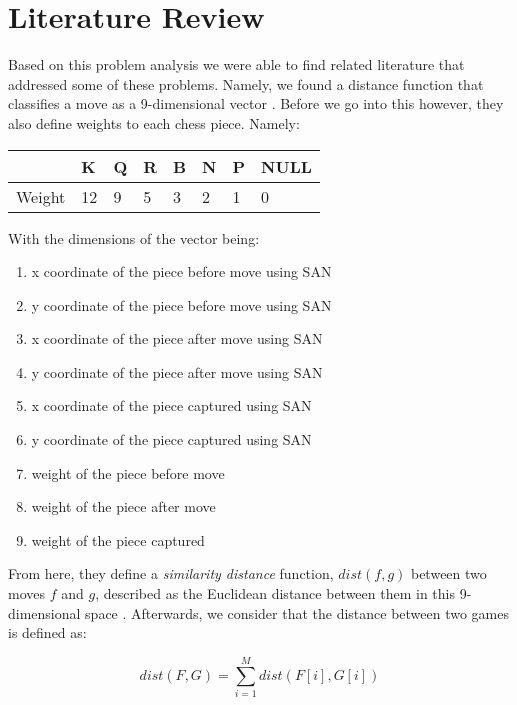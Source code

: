 \documentclass[12pt]{article}
\begin{document}
    \section{Literature Review}

    Based on this problem analysis we were able to find related literature that addressed some of these problems. Namely, we found a distance function that classifies a move as a 9-dimensional vector \cite{main}. Before we go into this however, they also define weights to each chess piece. Namely: 

    \begin{table}[ht]
        \begin{tabular}{|l|l|l|l|l|l|l|l|}
        \hline
            & K  & Q & R & B & N & P & NULL \\ \hline
        Weight & 12 & 9 & 5 & 3 & 2 & 1 & 0    \\ \hline
        \end{tabular}
    \end{table}

    With the dimensions of the vector being: 

    \begin{enumerate}
        \item x coordinate of the piece before move using SAN 
        \item y coordinate of the piece before move using SAN 
        \item x coordinate of the piece after move using SAN 
        \item y coordinate of the piece after move using SAN 
        \item x coordinate of the piece captured using SAN 
        \item y coordinate of the piece captured using SAN 
        \item weight of the piece before move 
        \item weight of the piece after move 
        \item weight of the piece captured
    \end{enumerate}

    From here, they define a \textit{similarity distance} function, $dist(f,g)$ between two moves $f$ and $g$, described as the Euclidean distance between them in this 9-dimensional space \cite{main}. Afterwards, we consider that the distance between two games is defined as:

    \begin{equation}
        dist(F,G) = \sum_{i=1}^M dist(F[i], G[i])
    \end{equation}
\end{document}
